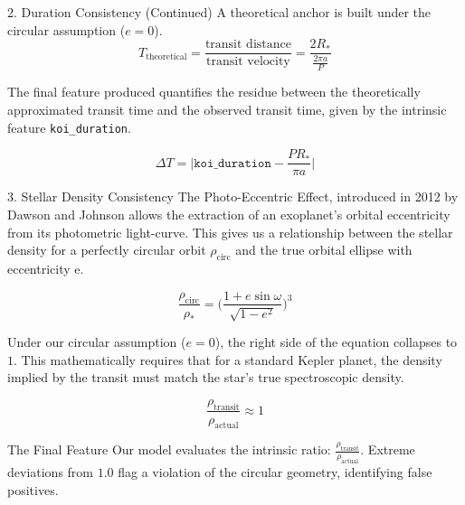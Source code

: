 \documentclass[9pt, aspectratio=169]{beamer}
\begin{document}
\begin{frame}{2. Duration Consistency (Continued)}
    A theoretical anchor is built under the circular assumption ($e=0$).
    \begin{equation}
        T_\text{theoretical}    = \frac{\text{transit distance}}{\text{transit velocity}}
                                = \frac{2R_*}{\frac{2\pi a}{P}}
    \end{equation}
    
    The final feature produced quantifies the residue between the theoretically approximated transit time and the observed transit time, given by the intrinsic feature \texttt{koi\_duration}.

    \begin{equation}
        \Delta T = \Bigg| \texttt{koi\_duration} - \frac{PR_*}{\pi a}\Bigg|
    \end{equation}
\end{frame}

\begin{frame}{3. Stellar Density Consistency}
    The Photo-Eccentric Effect, introduced in 2012 by Dawson and Johnson allows the extraction of an exoplanet's orbital eccentricity from its photometric light-curve. This gives us a relationship between the stellar density for a perfectly circular orbit $\rho_\text{circ}$ and the true orbital ellipse with eccentricity e.
    
    \begin{equation}
        \frac{\rho_\text{circ}}{\rho_*} = \Bigg(\frac{1 + e\sin\omega}{\sqrt{1 - e^2}}\Bigg)^3
    \end{equation}

    Under our circular assumption ($e = 0$), the right side of the equation collapses to $1$. This mathematically requires that for a standard Kepler planet, the density implied by the transit must match the star's true spectroscopic density.
    
    \begin{equation}
        \frac{\rho_{\text{transit}}}{\rho_{\text{actual}}} \approx 1
    \end{equation}

    \vspace{0.3cm}
    \begin{block}{The Final Feature}
        Our model evaluates the intrinsic ratio: \textbf{$\frac{\rho_{\text{transit}}}{\rho_{\text{actual}}}$}. Extreme deviations from $1.0$ flag a violation of the circular geometry, identifying false positives.
    \end{block}
\end{frame}
\end{document}
